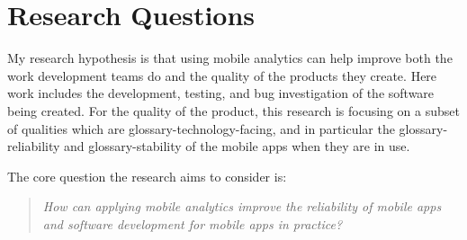 \section{Research Questions}
\label{section-research-questions}



My research hypothesis is that using mobile analytics can help improve both the work development teams do and the quality of the products they create. Here work includes the development, testing, and bug investigation of the software being created. For the quality of the product, this research is focusing on a subset of qualities which are \gls{glossary-technology-facing}, %
and in particular the \gls{glossary-reliability} and \gls{glossary-stability} of the mobile apps when they are in use.

The core question the research aims to consider is:
\begin{quote}
  \emph{How can applying mobile analytics improve the reliability of mobile apps and software development for mobile apps in practice?}~\label{overall-research-question}
\end{quote}

